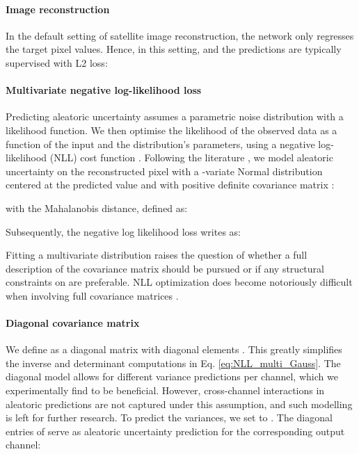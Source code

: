\documentclass[10pt,twocolumn,letterpaper]{article}
\newcommand{\equaref}[1]{ Eq. \ref{#1}}
\begin{document}
\paragraph{\bf Image reconstruction} In the default setting of satellite image reconstruction, the network only regresses the target pixel values. Hence, in this setting,  and the predictions are typically  supervised with L2 loss\cite{dong2015image,anwar2020deep}:




\paragraph{\bf Multivariate negative log-likelihood loss}
Predicting aleatoric uncertainty assumes a parametric noise distribution with a likelihood function. We then optimise the likelihood of the observed data as a function of the input and the distribution's parameters, using a negative log-likelihood (NLL) cost function \cite{bishop2006pattern}. Following the literature \cite{kendall2017uncertainties},  we model aleatoric uncertainty on the reconstructed pixel with a -variate Normal distribution centered at the predicted value  and with positive definite covariance matrix :




with  the Mahalanobis distance, defined as:


Subsequently, the negative log likelihood loss writes as:



Fitting a multivariate distribution raises the question of whether a full description of the covariance matrix should be pursued or if any structural constraints on  are preferable. NLL optimization does become notoriously difficult when involving full covariance matrices \cite{skafte2019reliable, seitzer2021pitfalls}. 

\paragraph{\bf Diagonal covariance matrix} We define  as a diagonal matrix with diagonal elements . This greatly simplifies the inverse and determinant computations in \equaref{eq:NLL_multi_Gauss}. The diagonal model allows for different variance predictions per channel, which we experimentally find to be beneficial. However, cross-channel interactions in aleatoric predictions are not captured under this assumption, and such modelling is left for further research. To predict the variances, we set  to .
The diagonal entries of   serve as aleatoric uncertainty prediction for the corresponding output channel:
\end{document}
